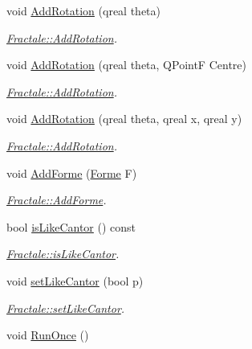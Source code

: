 \begin{DoxyCompactItemize}
void \hyperlink{class_fractale_a2a222da66f021b2cdd63d67f9ec0fb90}{Add\+Rotation} (qreal theta)
\begin{DoxyCompactList}\small\item\em \hyperlink{class_fractale_a2a222da66f021b2cdd63d67f9ec0fb90}{Fractale\+::\+Add\+Rotation}. \end{DoxyCompactList}\item 
void \hyperlink{class_fractale_a42e1fb35570d1a2a29ab18fbe1c66228}{Add\+Rotation} (qreal theta, Q\+Point\+F Centre)
\begin{DoxyCompactList}\small\item\em \hyperlink{class_fractale_a2a222da66f021b2cdd63d67f9ec0fb90}{Fractale\+::\+Add\+Rotation}. \end{DoxyCompactList}\item 
void \hyperlink{class_fractale_a3482fb8617cdc1002a0b1b6b94d0cb18}{Add\+Rotation} (qreal theta, qreal x, qreal y)
\begin{DoxyCompactList}\small\item\em \hyperlink{class_fractale_a2a222da66f021b2cdd63d67f9ec0fb90}{Fractale\+::\+Add\+Rotation}. \end{DoxyCompactList}\item 
void \hyperlink{class_fractale_a558ed8b360dcd396321ddd4c6b18aed3}{Add\+Forme} (\hyperlink{class_forme}{Forme} F)
\begin{DoxyCompactList}\small\item\em \hyperlink{class_fractale_a558ed8b360dcd396321ddd4c6b18aed3}{Fractale\+::\+Add\+Forme}. \end{DoxyCompactList}\item 
bool \hyperlink{class_fractale_a8a3f226eb475bb5645a81b3342a6c00d}{is\+Like\+Cantor} () const 
\begin{DoxyCompactList}\small\item\em \hyperlink{class_fractale_a8a3f226eb475bb5645a81b3342a6c00d}{Fractale\+::is\+Like\+Cantor}. \end{DoxyCompactList}\item 
void \hyperlink{class_fractale_a14d1e1b757de8d3cbfb227d50c2dbd4c}{set\+Like\+Cantor} (bool p)
\begin{DoxyCompactList}\small\item\em \hyperlink{class_fractale_a14d1e1b757de8d3cbfb227d50c2dbd4c}{Fractale\+::set\+Like\+Cantor}. \end{DoxyCompactList}\item 
\hypertarget{class_fractale_a27cf7a947501a5a7afe3afa893c0b9d2}{}void \hyperlink{class_fractale_a27cf7a947501a5a7afe3afa893c0b9d2}{Run\+Once} ()\label{class_fractale_a27cf7a947501a5a7afe3afa893c0b9d2}


\end{DoxyCompactItemize}
